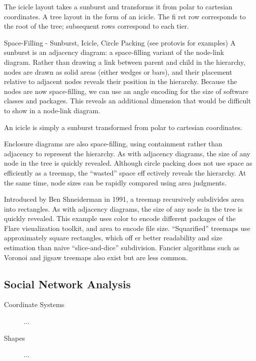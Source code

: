 The icicle layout takes a sunburst and transforms it from polar to cartesian coordinates. A tree layout in the form of an icicle. The fi rst row corresponds to the root of the tree; subsequent rows correspond to each tier.

Space-Filling
- Sunburst, Icicle, Circle Packing (see protovis for examples)
A sunburst is an adjacency diagram: a space-filling variant of the node-link diagram. Rather than drawing a link between parent and child in the hierarchy, nodes are drawn as solid areas (either wedges or bars), and their placement relative to adjacent nodes reveals their position in the hierarchy. Because the nodes are now space-filling, we can use an angle encoding for the size of software classes and packages. This reveals an additional dimension that would be difficult to show in a node-link diagram.

An icicle is simply a sunburst transformed from polar to cartesian coordinates. 

Enclosure diagrams are also space-filling, using containment rather than adjacency to represent the hierarchy.
As with adjacency diagrams, the size of any node in the tree is quickly revealed. Although circle packing does
not use space as efficiently as a treemap, the “wasted” space eff ectively reveals the hierarchy. At the same
time, node sizes can be rapidly compared using area judgments.

Introduced by Ben Shneiderman in 1991, a treemap recursively subdivides area into rectangles. As with adjacency diagrams, the size of any node in the tree is quickly revealed. This example uses color to encode different packages of the Flare visualization toolkit, and area to encode file size. “Squarified” treemaps use approximately square rectangles, which off er better readability and size estimation than naive “slice-and-dice” subdivision. Fancier algorithms such as Voronoi and jigsaw treemaps also exist but are less common.

\subsection{Social Network Analysis}\label{size-by-value}


\begin{description}
	\item[Coordinate Systems] ...
	\item[Shapes] ...
\end{description}

